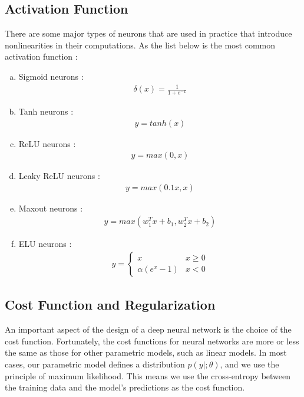 \documentclass{article}
\begin{document}
\subsection{Activation Function}
There are some major types of neurons that are used in practice that introduce nonlinearities in their computations. As the list below is the most common activation function :
\begin{enumerate}[(a)]
	\item Sigmoid neurons \citep{DBLP:journals/corr/ElfwingUD17} :
	\begin{align}
		\delta(x)= \frac{1}{1+e^{-x}}
	\end{align}
	\item Tanh neurons \citep{DBLP:journals/corr/abs-1811-03378} :
	\begin{align}
		y=\tag{12}tanh(x)
	\end{align}
	\item ReLU neurons \citep{DBLP:journals/corr/abs-1803-08375} :
	\begin{align}
		y=max(0,x)
	\end{align}
	\item Leaky ReLU neurons \citep{Zhang2017Dilated}:
	\begin{align}
		y=max(0.1x,x)
	\end{align}
	\item Maxout neurons \citep{DBLP:journals/corr/abs-1302-4389}:
	\begin{align}
		y=max(w^T_1x+b_1,w^T_2x+b_2)
	\end{align}
	\item ELU neurons \citep{Clevert2015Fast} :
	\begin{align}
		y=\begin{cases} x &x\ge 0 \\ \alpha(e^x-1) & x<0 \end{cases}
	\end{align}
\end{enumerate}
\subsection{Cost Function and Regularization}
An important aspect of the design of a deep neural network is the choice of the cost function. Fortunately, the cost functions for neural networks are more or less the same as those for other parametric models, such as linear models.
In most cases, our parametric model defines a distribution $p(y|;\theta)$, and we use the principle of maximum likelihood. This means we use the cross-entropy between the training data and the model's predictions as the cost function.
\end{document}
